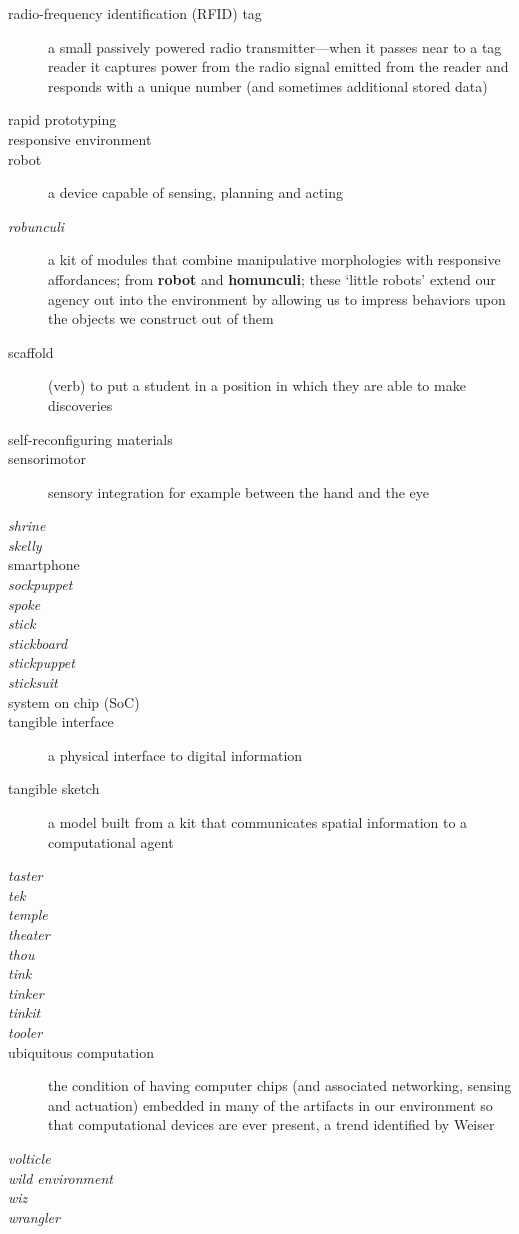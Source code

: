 \begin{description}
%
\item[radio-frequency identification (RFID) tag] a small passively powered radio transmitter---when it passes near to a tag reader it captures power from the radio signal emitted from the reader and responds with a unique number (and sometimes additional stored data)
%
\item[rapid prototyping]
%
\item[responsive environment]
%
\item[robot] a device capable of sensing, planning and acting
%
\item[\emph{robunculi}] a kit of modules that combine manipulative morphologies with responsive affordances; from {\bf robot} and {\bf homunculi}; these `little robots' extend our agency out into the environment by allowing us to impress behaviors upon the objects we construct out of them
%
\item[scaffold] (verb) to put a student in a position in which they are able to make discoveries
%
\item[self-reconfiguring materials]
%
\item[sensorimotor] sensory integration for example between the hand and the eye
%
\item[\emph{shrine}]
%
\item[\emph{skelly}]
%
\item[smartphone]
%
\item[\emph{sockpuppet}]
%
\item[\emph{spoke}]
%
\item[\emph{stick}]
%
\item[\emph{stickboard}]
%
\item[\emph{stickpuppet}]
%
\item[\emph{sticksuit}]
%
\item[system on chip (SoC)]
%
\item[tangible interface] a physical interface to digital information
%
\item[tangible sketch] a model built from a kit that communicates spatial information to a computational agent
%
\item[\emph{taster}]
%
\item[\emph{tek}]
%
\item[\emph{temple}]
%
\item[\emph{theater}]
%
\item[\emph{thou}]
%
\item[\emph{tink}]
%
\item[\emph{tinker}]
%
\item[\emph{tinkit}]
%
\item[\emph{tooler}]
%
\item[ubiquitous computation] the condition of having computer chips (and associated networking, sensing and actuation) embedded in many of the artifacts in our environment so that computational devices are ever present, a trend identified by Weiser \citeyearpar{weiser_1999}
%
\item[\emph{volticle}]
%
\item[\emph{wild environment}]
%
\item[\emph{wiz}]
%
\item[\emph{wrangler}]
%
\end{description}

